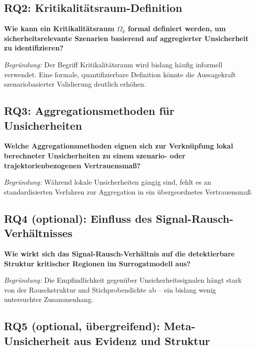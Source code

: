 \vspace{1em}

\subsection*{RQ2: Kritikalitätsraum-Definition}

\textbf{Wie kann ein Kritikalitätsraum $\Omega_k$ formal definiert werden, um sicherheitsrelevante Szenarien basierend auf aggregierter Unsicherheit zu identifizieren?}

\emph{Begründung:} Der Begriff Kritikalitätsraum wird bislang häufig informell verwendet. Eine formale, quantifizierbare Definition könnte die Aussagekraft szenariobasierter Validierung deutlich erhöhen.

\vspace{1em}

\subsection*{RQ3: Aggregationsmethoden für Unsicherheiten}

\textbf{Welche Aggregationsmethoden eignen sich zur Verknüpfung lokal berechneter Unsicherheiten zu einem szenario- oder trajektorienbezogenen Vertrauensmaß?}

\emph{Begründung:} Während lokale Unsicherheiten gängig sind, fehlt es an standardisierten Verfahren zur Aggregation in ein übergeordnetes Vertrauensmaß.

\vspace{1em}

\subsection*{RQ4 (optional): Einfluss des Signal-Rausch-Verhältnisses}

\textbf{Wie wirkt sich das Signal-Rausch-Verhältnis auf die detektierbare Struktur kritischer Regionen im Surrogatmodell aus?}

\emph{Begründung:} Die Empfindlichkeit gegenüber Unsicherheitssignalen hängt stark von der Rauschstruktur und Stichprobendichte ab – ein bislang wenig untersuchter Zusammenhang.

\vspace{1em}

\subsection*{RQ5 (optional, übergreifend): Meta-Unsicherheit aus Evidenz und Struktur}

